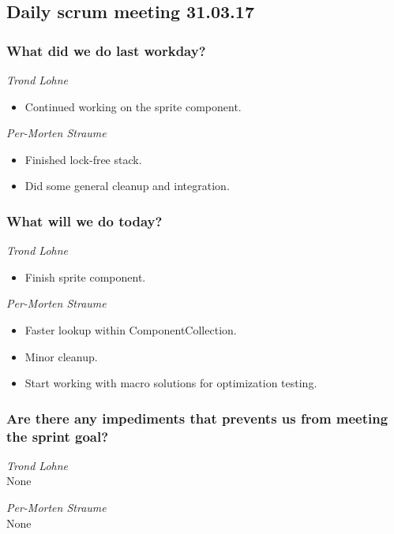 \documentclass{article}
\begin{document}
\begin{center}
\subsection*{Daily scrum meeting 31.03.17}
\end{center}
\bigskip


\subsubsection*{What did we do last workday?}

\noindent\textit{Trond Lohne}
\begin{itemize}
	\item 
	Continued working on the sprite component.
\end{itemize}

\medskip

\noindent\textit{Per-Morten Straume}
\begin{itemize}
	\item 
	Finished lock-free stack.
	
	\item 
	Did some general cleanup and integration.
\end{itemize}


\subsubsection*{What will we do today?}

\noindent\textit{Trond Lohne}
\begin{itemize}
	\item 
	Finish sprite component.
\end{itemize}

\medskip

\noindent\textit{Per-Morten Straume}
\begin{itemize}
	\item 
	Faster lookup within ComponentCollection.
	
	\item 
	Minor cleanup.
	
	\item 
	Start working with macro solutions for optimization testing.
\end{itemize}


\subsubsection*{Are there any impediments that prevents us from meeting the sprint goal?}

\noindent\textit{Trond Lohne}\\
None

\medskip

\noindent\textit{Per-Morten Straume}\\
None
\end{document}
